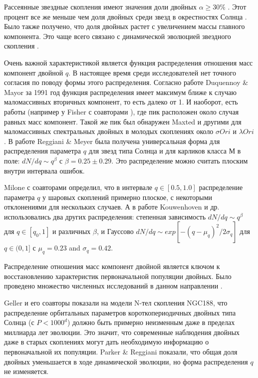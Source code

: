 \documentclass[a4paper,12pt]{article}
\begin{document}
Рассеянные звездные скопления имеют значения доли двойных $\alpha \geqslant 30\%$ \cite{Li17, Boni, Khalaj, Sarro, alPer}. Этот процент все же меньше чем доля двойных среди звезд в окрестностях Солнца \cite{Duq1}. Было также получено, что доля двойных растет с увеличением массы главного компонента. Это чаще всего связано с динамической эволюцией звездного скопления \cite{KOP,Dorval}.

Очень важной характеристикой является функция распределения отношения масс компонент двойной $q$. В настоящее время среди исследователей нет точного согласия по поводу формы этого распределения. Согласно работе Duquennoy \& Mayor за 1991 год \cite{Duq2} функция распределения имеет максимум ближе к случаю маломассивных вторичных компонент, то есть далеко от 1. И наоборот, есть работы (например у Fisher с соавторами \cite{Fisher}), где пик расположен около случая равных масс компонент. Такой же пик был  обнаружен Maxted и другими \cite{Maxted} для маломассивных спектральных двойных в молодых скоплениях около $\sigma Ori$ и $\lambda Ori$. В работе Reggiani \& Meyer \cite{RM} была получена универсальная форма для распределения параметра $q$ для звезд типа Солнца и для карликов класса М в поле: $dN/dq \sim q^{\beta}$ с $\beta=0.25\pm0.29$. Это распределение можно считать плоским внутри интервала ошибок. 

Milone \cite{Milone2012} с соавторами определил, что  в интервале $q\in[0.5,1.0]$ распределение параметра $q$ у шаровых скоплений примерно плоское, с некоторыми отклонениями для нескольких случаев. А в работе Kouwenhoven и др. \cite{Kouwenhoven} использовались два других распределения: степенная зависимость $dN/dq \sim q^{\beta}$ для $q\in[q_0,1]$ и различных $\beta$, и Гауссово $dN/dq \sim exp[-(q-\mu_q)^2/2\sigma_q]$ для $q\in(0,1]$ с $\mu_q=0.23$ and $\sigma_q=0.42$.

Распределение отношения масс компонент двойной является ключом к восстановлению характеристик первоначальной популяции двойных. Было проведено множество численных исследований в данном направлении \cite{Kroupa2011,Geller2013,PR}.

Geller  и его соавторы \cite{Geller2013} показали на модели N-тел скопления NGC188, что распределение орбитальных параметров короткопериодичных двойных типа Солнца (с $P<1000^d$) должно быть примерно неизменным даже в пределах миллиарда лет эволюции. Это значит, что современные наблюдения двойных даже в старых скоплениях могут дать необходимую информацию о первоначальной их популяции. Parker \& Reggiani \cite{PR} показали, что общая доля двойных уменьшается в ходе динамической эволюции, но форма распределения $q$ не изменяется.  
\end{document}
